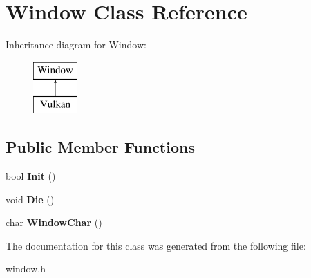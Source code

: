 \hypertarget{classWindow}{}\section{Window Class Reference}
\label{classWindow}
Inheritance diagram for Window\+:\begin{figure}[H]
\begin{center}
\leavevmode
\includegraphics[height=2.000000cm]{classWindow}
\end{center}
\end{figure}
\subsection*{Public Member Functions}
\begin{DoxyCompactItemize}
\item 
\mbox{\label{classWindow_a81a8bcd04b0b760f5616893c318bb705}} 
bool {\bfseries Init} ()
\item 
\mbox{\label{classWindow_a1da23fba0fda380329f20484244814e1}} 
void {\bfseries Die} ()
\item 
\mbox{\label{classWindow_a839fb7e78dd72784f6ed8097131d9e9e}} 
char {\bfseries Window\+Char} ()
\end{DoxyCompactItemize}


The documentation for this class was generated from the following file\+:\begin{DoxyCompactItemize}
\item 
window.\+h\end{DoxyCompactItemize}

